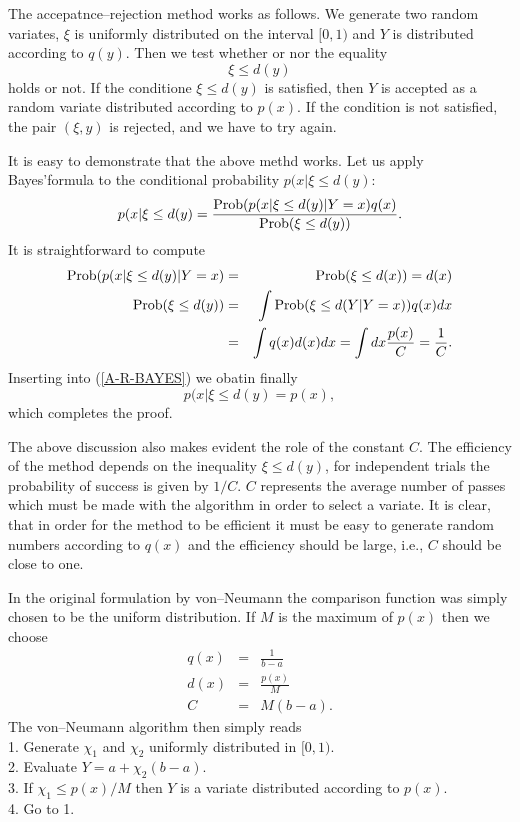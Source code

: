The accepatnce--rejection method works as follows. We generate two
random variates, $\xi$ is uniformly distributed on the interval
$[0,1)$ and $Y$ is distributed according to $q(y)$. Then we test
whether or nor the equality
\begin{equation*}
\xi \le d(y)
\end{equation*}
holds or not. If  the conditione $\xi \le d(y)$ is satisfied, 
then $Y$ is accepted as 
a random variate distributed according to $p(x)$.  If
the condition is not satisfied, the pair $(\xi,y)$ is rejected, 
and we have to try again.

It is easy to demonstrate that the above methd works. Let us apply
Bayes'formula to the conditional probability $p(x|\xi \le d(y)$:
\begin{equation}
\label{A-R-BAYES}
p(x|\xi \le d(y) = \frac{{\rm Prob}(p(x|\xi \le d(y)|Y=x)q(x)}
                  {{\rm Prob}(\xi \le d(y))}.
\end{equation}
It is straightforward to compute
\begin{eqnarray*}
{\rm Prob}(p(x|\xi \le d(y)|Y=x) &=& {\rm Prob}(\xi \le d(x)) = 
          d(x) \\
{\rm Prob}(\xi \le d(y)) & = & \int {\rm Prob}(\xi \le d(Y|Y=x)) q(x) dx \\
               &= & \int q(x) d(x)dx = \int dx \frac{p(x)}{C} = 
                   \frac{1}{C}.
\end{eqnarray*}
Inserting into (\ref{A-R-BAYES}) we obatin finally
\begin{equation*}
p(x|\xi \le d(y) = p(x),
\end{equation*}
which completes the proof.

The above discussion also makes evident the role of the constant
$C$. The efficiency of the method depends on the inequality $\xi \le 
d(y)$, for independent trials the probability of success is given 
by $1/C$. $C$ represents the average number of passes which must 
be made with the algorithm in order to select a variate. It is 
clear, that in order for the method to be efficient it must be 
easy to generate random numbers according to $q(x)$ and the 
efficiency should be large, i.e., $C$ should be close to one.

In the original formulation by von--Neumann the comparison 
function was simply chosen to be the uniform distribution. If
$M$ is the maximum of $p(x)$ then we choose
\begin{eqnarray*}
q(x) & = & \frac{1}{b-a} \\
d(x) & = & \frac{p(x)}{M} \\
C & = & M(b-a).
\end{eqnarray*}
The von--Neumann algorithm then simply reads \\
1. Generate $\chi_1$ and $\chi_2$ uniformly distributed in 
    $[0,1)$. \\
2. Evaluate $Y=a+\chi_2(b-a)$. \\
3. If $\chi_1 \le p(x)/M$ then $Y$ is a variate distributed 
    according to $p(x)$. \\
4. Go to 1.

